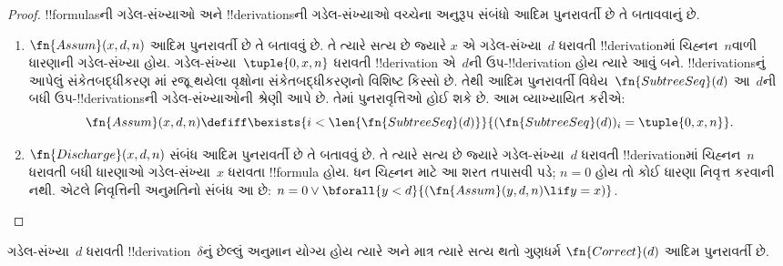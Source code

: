 \documentclass[../../../include/open-logic-section]{subfiles}
\begin{document}
\begin{proof}
  !!{formula}sની ગડેલ-સંખ્યાઓ અને
  !!{derivation}sની ગડેલ-સંખ્યાઓ વચ્ચેના
  અનુરૂપ સંબંધો આદિમ પુનરાવર્તી છે
  તે બતાવવાનું છે.
  \begin{enumerate}
  \item $\fn{Assum}(x, d, n)$ આદિમ
    પુનરાવર્તી છે તે બતાવવું છે. તે
    ત્યારે સત્ય છે જ્યારે $x$ એ
    ગડેલ-સંખ્યા~$d$ ધરાવતી
    !!{derivation}માં ચિહ્નન~$n$વાળી
    ધારણાની ગડેલ-સંખ્યા હોય.
    ગડેલ-સંખ્યા~$\tuple{0, x,
      n}$ ધરાવતી !!{derivation} એ~$d$ની
    ઉપ-!!{derivation} હોય ત્યારે આવું બને.
    !!{derivation}sનું આપેલું
    સંકેતબદ્ધીકરણ
    માં રજૂ થયેલા
    વૃક્ષોના સંકેતબદ્ધીકરણનો વિશિષ્ટ
    કિસ્સો છે. તેથી આદિમ પુનરાવર્તી
    વિધેય~$\fn{SubtreeSeq}(d)$ આ~$d$ની
    બધી ઉપ-!!{derivation}sની ગડેલ-સંખ્યાઓની
    શ્રેણી આપે છે. તેમાં પુનરાવૃત્તિઓ હોઈ શકે છે.
    આમ વ્યાખ્યાયિત કરીએ:
    \[
    \fn{Assum}(x, d, n) \defiff \bexists{i<\len{\fn{SubtreeSeq}(d)}}{(\fn{SubtreeSeq}(d))_i =
      \tuple{0, x, n}}.
    \]
  \item $\fn{Discharge}(x, d, n)$
    સંબંધ આદિમ પુનરાવર્તી છે તે બતાવવું છે.
    તે ત્યારે સત્ય છે જ્યારે ગડેલ-સંખ્યા~$d$
    ધરાવતી !!{derivation}માં ચિહ્નન~$n$
    ધરાવતી બધી ધારણાઓ ગડેલ-સંખ્યા~$x$
    ધરાવતા !!{formula} હોય. ધન ચિહ્નન માટે આ શરત
    તપાસવી પડે; $n=0$ હોય તો કોઈ ધારણા નિવૃત્ત કરવાની નથી.
    એટલે નિવૃત્તિની અનુમતિનો સંબંધ આ છે:
    $n=0 \lor \bforall{y<d}{(\fn{Assum}(y, d, n) \lif y
      = x)}$.
  \end{enumerate}
\end{proof}

\begin{prop}
  ગડેલ-સંખ્યા~$d$ ધરાવતી
  !!{derivation}~$\delta$નું છેલ્લું
  અનુમાન યોગ્ય હોય ત્યારે અને માત્ર
  ત્યારે સત્ય થતો ગુણધર્મ
  $\fn{Correct}(d)$ આદિમ પુનરાવર્તી છે.
\end{prop}
\end{document}
